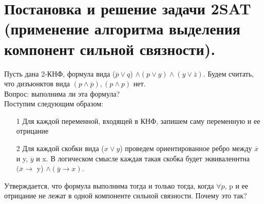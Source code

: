 \setcounter{section}{32}
\section{Постановка и решение задачи 2SAT (применение алгоритма выделения компонент сильной связности).}
Пусть дана 2-КНФ, формула вида ($\overline{p} \vee q$) $\wedge (p \vee y) \wedge (y \vee \overline{z})$. Будем считать, что дизъюнктов вида $(p \wedge \overline{p}), (p \wedge p)$ нет.
\\ Вопрос: выполнима ли эта формула?
\\
Поступим следующим образом:
\begin{itemize}
    \item [1] Для каждой переменной, входящей в КНФ, запишем саму переменную и ее отрицание
    \item [2] Для каждой скобки вида ($x \vee y$) проведем ориентированное ребро между $\overline{x}$ и y,  $\overline{y}$ и x. В логическом смысле каждая такая скобка будет эквиваленнтна $(\overline{x} \rightarrow$  y) $\wedge (\overline{y} \rightarrow x)$.
\end{itemize}
 Утверждается, что формула выполнима тогда и только тогда, когда $\forall p$, p и ее отрицание не лежат в одной компоненте сильной связности. Почему это так? 

